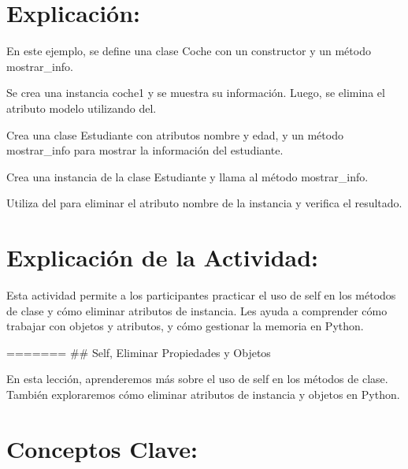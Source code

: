 \documentclass[
  a4paper,
  onepage,
  openany]{scrreprt}
\begin{document}
\hypertarget{explicaciuxf3n-54}{%
\section{Explicación:}\label{explicaciuxf3n-54}}

En este ejemplo, se define una clase Coche con un constructor y un
método mostrar\_info.

Se crea una instancia coche1 y se muestra su información. Luego, se
elimina el atributo modelo utilizando del.

\begin{tcolorbox}[enhanced jigsaw, breakable, opacityback=0, toptitle=1mm, coltitle=black, toprule=.15mm, rightrule=.15mm, colframe=quarto-callout-important-color-frame, opacitybacktitle=0.6, arc=.35mm, title=\textcolor{quarto-callout-important-color}{\faExclamation}\hspace{0.5em}{Actividad Práctica:}, titlerule=0mm, colbacktitle=quarto-callout-important-color!10!white, bottomtitle=1mm, bottomrule=.15mm, colback=white, left=2mm, leftrule=.75mm]

Crea una clase Estudiante con atributos nombre y edad, y un método
mostrar\_info para mostrar la información del estudiante.

Crea una instancia de la clase Estudiante y llama al método
mostrar\_info.

Utiliza del para eliminar el atributo nombre de la instancia y verifica
el resultado.

\end{tcolorbox}

\hypertarget{explicaciuxf3n-de-la-actividad-52}{%
\section{Explicación de la
Actividad:}\label{explicaciuxf3n-de-la-actividad-52}}

Esta actividad permite a los participantes practicar el uso de self en
los métodos de clase y cómo eliminar atributos de instancia. Les ayuda a
comprender cómo trabajar con objetos y atributos, y cómo gestionar la
memoria en Python.

======= \#\# Self, Eliminar Propiedades y Objetos

En esta lección, aprenderemos más sobre el uso de self en los métodos de
clase. También exploraremos cómo eliminar atributos de instancia y
objetos en Python.

\hypertarget{conceptos-clave-55}{%
\section{Conceptos Clave:}\label{conceptos-clave-55}}
\end{document}
